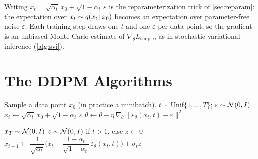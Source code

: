 \begin{remark}
Writing $x_t=\sqrt{\bar\alpha_t}\,x_0+\sqrt{1-\bar\alpha_t}\,\varepsilon$ is the reparameterization trick of \cref{sec:reparam}: the expectation over $x_t\sim q(x_t\,|\, x_0)$ becomes an expectation over parameter-free noise $\varepsilon$. Each training step draws one $t$ and one $\varepsilon$ per data point, so the gradient is an unbiased Monte Carlo estimate of $\nabla_\theta L_{\mathrm{simple}}$, as in stochastic variational inference (\cref{alg:svi}).
\end{remark}

\section{The DDPM Algorithms}\label{sec:ddpm}

\begin{algorithm}[H]
\caption{DDPM Training}\label{alg:ddpm-train}
\begin{algorithmic}[1]
\Repeat
  \State Sample a data point $x_0$ (in practice a minibatch).
  \State $t\sim\mathrm{Unif}\{1,\dots,T\}$; \quad $\varepsilon\sim\mathcal{N}(0,I)$
  \State $x_t\gets\sqrt{\bar\alpha_t}\,x_0+\sqrt{1-\bar\alpha_t}\,\varepsilon$ 
  \State $\theta\gets\theta-\eta\,\nabla_\theta\big\|\varepsilon_\theta(x_t,t)-\varepsilon\big\|^2$
\end{algorithmic}
\end{algorithm}

\begin{algorithm}[H]
\caption{DDPM Sampling}\label{alg:ddpm-sample}
\begin{algorithmic}[1]
\State $x_T\sim\mathcal{N}(0,I)$
  \State $z\sim\mathcal{N}(0,I)$ if $t>1$, else $z\gets0$
  \State $x_{t-1}\gets\dfrac{1}{\sqrt{\alpha_t}}\Big(x_t-\dfrac{1-\alpha_t}{\sqrt{1-\bar\alpha_t}}\,\varepsilon_\theta(x_t,t)\Big)+\sigma_tz$ 
\EndFor
{}
\end{algorithmic}
\end{algorithm}

